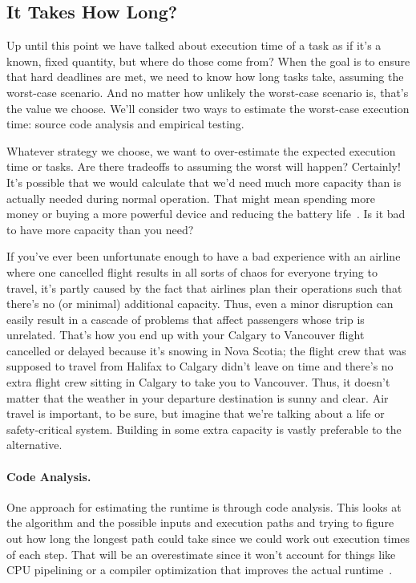 \subsection*{It Takes How Long?}
Up until this point we have talked about execution time of a task as if it's a known, fixed quantity, but where do those come from? When the goal is to ensure that hard deadlines are met, we need to know how long tasks take, assuming the worst-case scenario. And no matter how unlikely the worst-case scenario is, that's the value we choose. We'll consider two ways to estimate the worst-case execution time: source code analysis and empirical testing.

Whatever strategy we choose, we want to over-estimate the expected execution time or tasks. Are there tradeoffs to assuming the worst will happen? Certainly! It's possible that we would calculate that we'd need much more capacity than is actually needed during normal operation. That might mean spending more money or buying a more powerful device and reducing the battery life~\cite{mte241}. Is it bad to have more capacity than you need? 

If you've ever been unfortunate enough to have a bad experience with an airline where one cancelled flight results in all sorts of chaos for everyone trying to travel, it's partly caused by the fact that airlines plan their operations such that there's no (or minimal) additional capacity. Thus, even a minor disruption can easily result in a cascade of problems that affect passengers whose trip is unrelated. That's how you end up with your Calgary to Vancouver flight cancelled or delayed because it's snowing in Nova Scotia; the flight crew that was supposed to travel from Halifax to Calgary didn't leave on time and there's no extra flight crew sitting in Calgary to take you to Vancouver. Thus, it doesn't matter that the weather in your departure destination is sunny and clear. Air travel is important, to be sure, but imagine that we're talking about a life or safety-critical system. Building in some extra capacity is vastly preferable to the alternative.

\paragraph{Code Analysis.} One approach for estimating the runtime is through code analysis. This looks at the algorithm and the possible inputs and execution paths and trying to figure out how long the longest path could take since we could work out execution times of each step. That will be an overestimate since it won't account for things like CPU pipelining or a compiler optimization that improves the actual runtime~\cite{mte241}.

